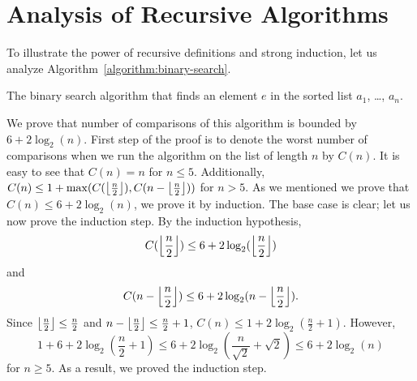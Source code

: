 \section{Analysis of Recursive Algorithms}
To illustrate the power of recursive definitions and strong induction, let us
analyze Algorithm~\ref{algorithm:binary-search}.
\begin{algorithm}
  \begin{algorithmic}[1]
            \State{}
          \EndIf
        \EndFor
      \Else
          \State{}
        \Else
          \State{}
        \EndIf
      \EndIf
    \EndFunction
  \end{algorithmic}
  \caption{The binary search algorithm that finds an element $e$ in the sorted
    list $a_1$, \dots, $a_n$.}
  \label{algorithm:binary-search}
\end{algorithm}
We prove that number of comparisons of this algorithm is bounded by
$6 + 2\log_2(n)$. First step of the proof is to denote the worst
number of comparisons when we run the algorithm on the list of length $n$ by
$C(n)$. It is easy to see that $C(n) = n$ for $n \le 5$. Additionally,
$C(n) \le 1 + \max(C(\left\lfloor {\frac{n}{2}} \right\rfloor), C(n - \left\lfloor {\frac{n}{2}} \right\rfloor))$ for
$n > 5$. As we mentioned we prove that $C(n) \le 6 + 2\log_2(n)$, we prove it
by induction. The base case is clear; let us now prove the induction step.
By the induction hypothesis,
\[
  C(\left\lfloor {\frac{n}{2}} \right\rfloor) \le 6 + 2\log_2(\left\lfloor {\frac{n}{2}} \right\rfloor)
\]
and
\[
  C(n - \left\lfloor {\frac{n}{2}} \right\rfloor) \le 6 + 2\log_2(n - \left\lfloor {\frac{n}{2}} \right\rfloor).
\]
Since $\left\lfloor {\frac{n}{2}} \right\rfloor \le \frac{n}{2}$ and $n - \left\lfloor {\frac{n}{2}} \right\rfloor \le
\frac{n}{2} + 1$, $C(n) \le 1 + 2\log_2(\frac{n}{2} + 1)$.
However,
\[
  1 + 6 + 2\log_2\left(\frac{n}{2} + 1\right) \le
  6 + 2\log_2\left(\frac{n}{\sqrt{2}} + \sqrt{2}\right) \le 6 + 2 \log_2(n)
\]
for $n \ge 5$. As a result, we proved the induction step.

